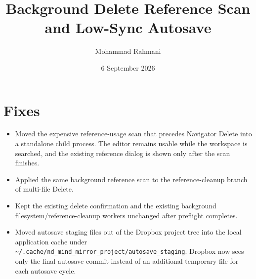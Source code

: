 \documentclass[a4paper]{article}
\title{Background Delete Reference Scan and Low-Sync Autosave}
\date{6 September 2026}
\author{Mohammad Rahmani}
\begin{document}
   \maketitle

   \section{Fixes}
   \begin{itemize}
      \item Moved the expensive reference-usage scan that precedes Navigator Delete into a standalone child process. The editor remains usable while the workspace is searched, and the existing reference dialog is shown only after the scan finishes.
      \item Applied the same background reference scan to the reference-cleanup branch of multi-file Delete.
      \item Kept the existing delete confirmation and the existing background filesystem/reference-cleanup workers unchanged after preflight completes.
      \item Moved autosave staging files out of the Dropbox project tree into the local application cache under \texttt{\~{}/.cache/nd\_mind\_mirror\_project/autosave\_staging}. Dropbox now sees only the final autosave commit instead of an additional temporary file for each autosave cycle.
   \end{itemize}

   
   
\end{document}

